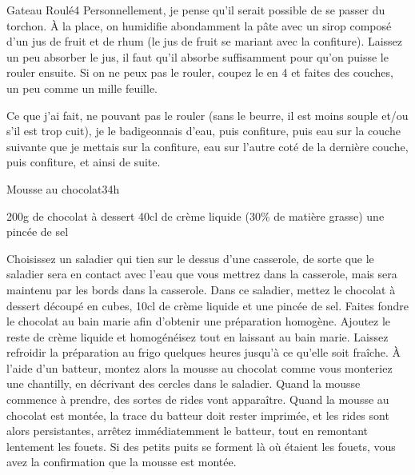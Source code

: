 \begin{recette}{Gateau Roulé}{4}{}{}
Personnellement, je pense qu'il serait possible de se passer du torchon. À la place, on humidifie abondamment la pâte avec un sirop composé d'un jus de fruit et de rhum (le jus de fruit se mariant avec la confiture). Laissez un peu absorber le jus, il faut qu'il absorbe suffisamment pour qu'on puisse le rouler ensuite. Si on ne peux pas le rouler, coupez le en 4 et faites des couches, un peu comme un mille feuille.

Ce que j'ai fait, ne pouvant pas le rouler (sans le beurre, il est moins souple et/ou s'il est trop cuit), je le badigeonnais d'eau, puis confiture, puis eau sur la couche suivante que je mettais sur la confiture, eau sur l'autre coté de la dernière couche, puis confiture, et ainsi de suite.

\end{recette}

\begin{recette}{Mousse au chocolat}{3}{4h}{}
\begin{ingredients}
\ingredient 200g de chocolat à dessert
\ingredient 40cl de crème liquide (30\% de matière grasse)
\ingredient une pincée de sel
\end{ingredients}

\begin{preparation}
\etape Choisissez un saladier qui tien sur le dessus d'une casserole, de sorte que le saladier sera en contact avec l'eau que vous mettrez dans la casserole, mais sera maintenu par les bords dans la casserole.
\etape Dans ce saladier, mettez le chocolat à dessert découpé en cubes, 10cl de crème liquide et une pincée de sel. Faites fondre le chocolat au bain marie afin d'obtenir une préparation homogène.
\etape Ajoutez le reste de crème liquide et homogénéisez tout en laissant au bain marie.
\etape Laissez refroidir la préparation au frigo quelques heures jusqu'à ce qu'elle soit fraîche.
\etape À l'aide d'un batteur, montez alors la mousse au chocolat comme vous monteriez une chantilly, en décrivant des cercles dans le saladier. Quand la mousse commence à prendre, des sortes de rides vont apparaître. Quand la mousse au chocolat est montée, la trace du batteur doit rester imprimée, et les rides sont alors persistantes, arrêtez immédiatemment le batteur, tout en remontant lentement les fouets. Si des petits puits se forment là où étaient les fouets, vous avez la confirmation que la mousse est montée.
\end{preparation}
\end{recette}


